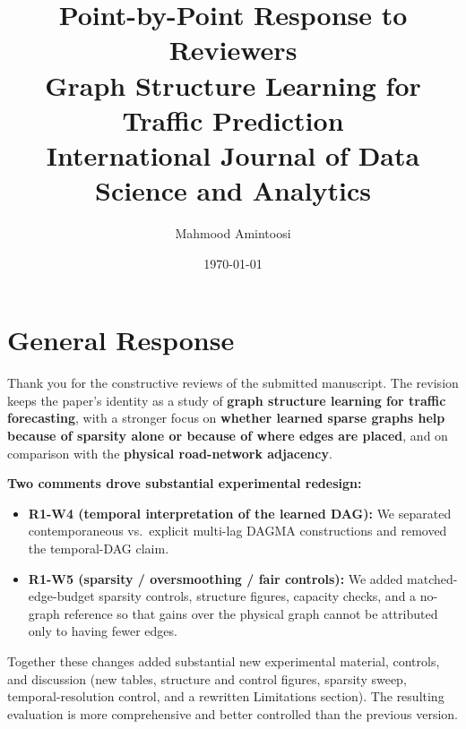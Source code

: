 \documentclass[a4paper,11pt]{article}
\begin{document}
\title{Point-by-Point Response to Reviewers\\
    \large Graph Structure Learning for Traffic Prediction\\
    \normalsize International Journal of Data Science and Analytics}
\author{Mahmood Amintoosi}
\date{\today}
\maketitle

\tableofcontents


\section{General Response}

Thank you for the constructive reviews of the submitted manuscript. The revision keeps the paper's identity as a study of \textbf{graph structure learning for traffic forecasting}, with a stronger focus on \textbf{whether learned sparse graphs help because of sparsity alone or because of where edges are placed}, and on comparison with the \textbf{physical road-network adjacency}.



\textbf{Two comments drove substantial experimental redesign:}
\begin{itemize}
    \item \textbf{R1-W4 (temporal interpretation of the learned DAG):} We separated contemporaneous vs.\ explicit multi-lag DAGMA constructions and removed the temporal-DAG claim.
    \item \textbf{R1-W5 (sparsity / oversmoothing / fair controls):} We added matched-edge-budget sparsity controls, structure figures, capacity checks, and a no-graph reference so that gains over the physical graph cannot be attributed only to having fewer edges.
\end{itemize}

Together these changes added substantial new experimental material, controls, and discussion (new tables, structure and control figures, sparsity sweep, temporal-resolution control, and a rewritten Limitations section). The resulting evaluation is more comprehensive and better controlled than the previous version.
\end{document}
